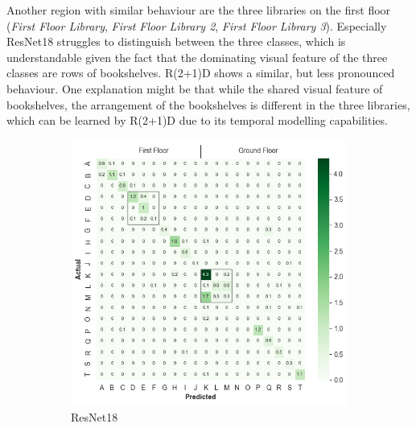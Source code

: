 \documentclass[a4paper]{article}
\begin{document}
Another region with similar behaviour are the three libraries on the first
floor (\textit{First Floor Library}, \textit{First
Floor Library 2}, \textit{First Floor Library 3}). Especially ResNet18
struggles to distinguish between the three classes, which is understandable
given the fact that the dominating visual feature of the three classes are 
rows of bookshelves. R(2+1)D shows a similar, but less pronounced behaviour.
One explanation might be that while the shared visual feature of bookshelves,
the arrangement of the bookshelves is different in the three libraries, which
can be learned by R(2+1)D due to its temporal modelling capabilities.

\begin{figure}
  \centering
  \begin{subfigure}[b]{0.49\textwidth}
    \includegraphics[width=\textwidth]{./figures/conf-matrix-resnet18.png}
    \caption{ResNet18}
  \end{subfigure}
  \begin{subfigure}[b]{0.49\textwidth}

\end{subfigure}
\end{figure}
\end{document}
